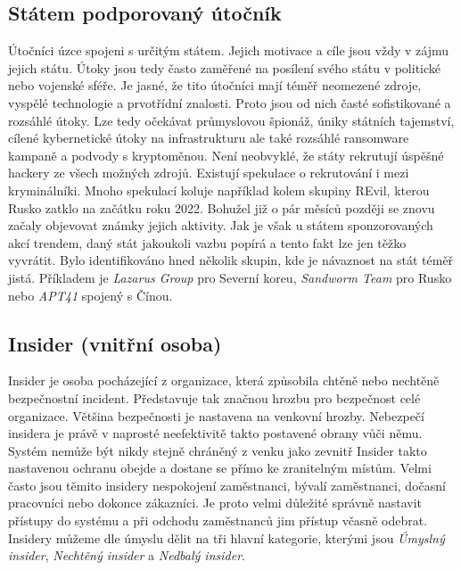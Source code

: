 \subsection{Státem podporovaný útočník}
Útočníci úzce spojeni s určitým státem.
Jejich motivace a cíle jsou vždy v zájmu jejich státu.
Útoky jsou tedy často zaměřené na posílení svého státu v politické nebo vojenské sféře.
Je jasné, že tito útočníci mají téměř neomezené zdroje, vyspělé technologie a prvotřídní znalosti.
Proto jsou od nich časté sofistikované a rozsáhlé útoky.
Lze tedy očekávat průmyslovou špionáž, úniky státních tajemství, cílené kybernetické útoky na infrastrukturu ale také rozsáhlé ransomware kampaně a podvody s kryptoměnou.
Není neobvyklé, že státy rekrutují úspěšné hackery ze všech možných zdrojů.
Existují spekulace o rekrutování i mezi kryminálníki.
Mnoho spekulací koluje například kolem skupiny REvil, kterou Rusko zatklo na začátku roku 2022\cite{REvil_story}.
Bohužel již o pár měsíců později se znovu začaly objevovat známky jejich aktivity.
Jak je však u státem sponzorovaných akcí trendem, daný stát jakoukoli vazbu popírá a tento fakt lze jen těžko vyvrátit.
Bylo identifikováno hned několik skupin, kde je návaznost na stát téměř jistá.
Příkladem je \textit{Lazarus Group} pro Severní koreu, \textit{Sandworm Team} pro Rusko nebo \textit{APT41} spojený s Čínou\cite{Mitre_groups}.

\subsection{Insider (vnitřní osoba)}
Insider je osoba pocházející z organizace, která způsobila chtěně nebo nechtěně bezpečnostní incident.
Představuje tak značnou hrozbu pro bezpečnost celé organizace.
Většina bezpečnosti je nastavena na venkovní hrozby.
Nebezpečí insidera je právě v naprosté neefektivitě takto postavené obrany vůči němu.
Systém nemůže být nikdy stejně chráněný z venku jako zevnitř
Insider takto nastavenou ochranu obejde a dostane se přímo ke zranitelným místům.
Velmi často jsou těmito insidery nespokojení zaměstnanci, bývalí zaměstnanci, dočasní pracovníci nebo dokonce zákazníci.
Je proto velmi důležité správně nastavit přístupy do systému a při odchodu zaměstnanců jim přístup včasně odebrat.
Insidery můžeme dle úmyslu dělit na tři hlavní kategorie, kterými jsou \textit{Úmyslný insider}, \textit{Nechtěný insider} a \textit{Nedbalý insider}.

